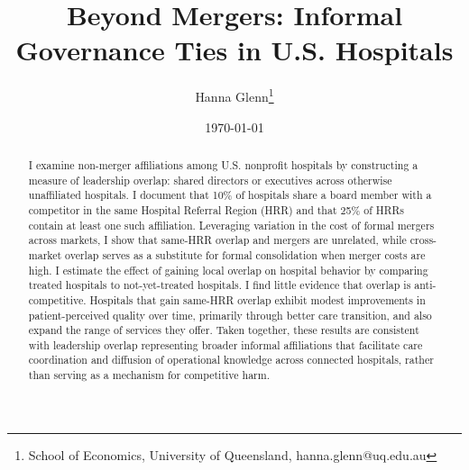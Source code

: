 \documentclass[12pt]{article}
\begin{document}
	
	
	
	
	\linespread{1.2}\title{\vspace{-0.5in} Beyond Mergers: Informal Governance Ties in U.S. Hospitals} 
	
	\date{\today}
	
	\author{\vspace{10mm}Hanna Glenn\footnote{School of Economics, University of Queensland, hanna.glenn@uq.edu.au} }
	
	\maketitle
	
	\vspace{-0.2in}
	
	\singlespacing\maketitle


 \vspace{3mm}
	
\begin{abstract}
\small{I examine non-merger affiliations among U.S. nonprofit hospitals by constructing a measure of leadership overlap: shared directors or executives across otherwise unaffiliated hospitals. I document that 10\% of hospitals share a board member with a competitor in the same Hospital Referral Region (HRR) and that 25\% of HRRs contain at least one such affiliation. Leveraging variation in the cost of formal mergers across markets, I show that same-HRR overlap and mergers are unrelated, while cross-market overlap serves as a substitute for formal consolidation when merger costs are high. I estimate the effect of gaining local overlap on hospital behavior by comparing treated hospitals to not-yet-treated hospitals. I find little evidence that overlap is anti-competitive. Hospitals that gain same-HRR overlap exhibit modest improvements in patient-perceived quality over time, primarily through better care transition, and also expand the range of services they offer. Taken together, these results are consistent with leadership overlap representing broader informal affiliations that facilitate care coordination and diffusion of operational knowledge across connected hospitals, rather than serving as a mechanism for competitive harm.}
\end{abstract}
	
	
	
\end{document}
